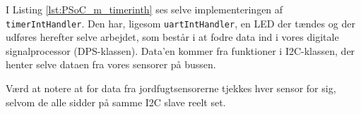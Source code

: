 

I Listing \ref{lst:PSoC_m_timerinth} ses selve implementeringen af \texttt{timerIntHandler}. 
Den har, ligesom \texttt{uartIntHandler}, en LED der tændes og der udføres herefter selve arbejdet, som består i at fodre data ind i vores digitale signalprocessor (DPS-klassen). 
Data'en kommer fra funktioner i I2C-klassen, der henter selve dataen fra vores sensorer på \IIC bussen.

Værd at notere at for data fra jordfugtsensorerne tjekkes hver sensor for sig, selvom de alle sidder på samme I2C slave reelt set.

\clearpage